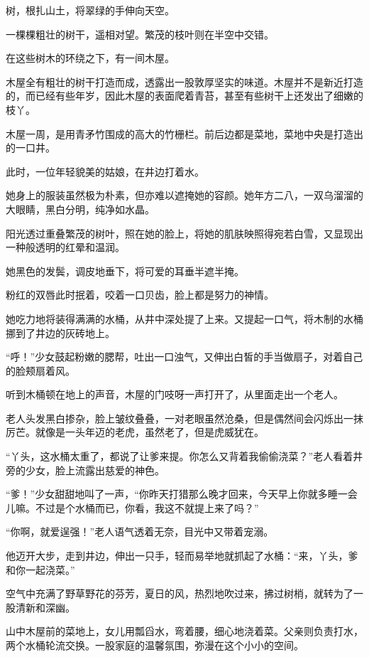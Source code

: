 
\begin{this_body}

树，根扎山土，将翠绿的手伸向天空。

一棵棵粗壮的树干，遥相对望。繁茂的枝叶则在半空中交错。

在这些树木的环绕之下，有一间木屋。

木屋全有粗壮的树干打造而成，透露出一股敦厚坚实的味道。木屋并不是新近打造的，而已经有些年岁，因此木屋的表面爬着青苔，甚至有些树干上还发出了细嫩的枝丫。

木屋一周，是用青矛竹围成的高大的竹栅栏。前后边都是菜地，菜地中央是打造出的一口井。

此时，一位年轻貌美的姑娘，在井边打着水。

她身上的服装虽然极为朴素，但亦难以遮掩她的容颜。她年方二八，一双乌溜溜的大眼睛，黑白分明，纯净如水晶。

阳光透过重叠繁茂的树叶，照在她的脸上，将她的肌肤映照得宛若白雪，又显现出一种般透明的红晕和温润。

她黑色的发鬓，调皮地垂下，将可爱的耳垂半遮半掩。

粉红的双唇此时抿着，咬着一口贝齿，脸上都是努力的神情。

她吃力地将装得满满的水桶，从井中深处提了上来。又提起一口气，将木制的水桶挪到了井边的灰砖地上。

“呼！”少女鼓起粉嫩的腮帮，吐出一口浊气，又伸出白皙的手当做扇子，对着自己的脸颊扇着风。

听到木桶顿在地上的声音，木屋的门吱呀一声打开了，从里面走出一个老人。

老人头发黑白掺杂，脸上皱纹叠叠，一对老眼虽然沧桑，但是偶然间会闪烁出一抹厉芒。就像是一头年迈的老虎，虽然老了，但是虎威犹在。

“丫头，这水桶太重了，都说了让爹来提。你怎么又背着我偷偷浇菜？”老人看着井旁的少女，脸上流露出慈爱的神色。

“爹！”少女甜甜地叫了一声，“你昨天打猎那么晚才回来，今天早上你就多睡一会儿嘛。不过是个水桶而已，你看，我这不就提上来了吗？”

“你啊，就爱逞强！”老人语气透着无奈，目光中又带着宠溺。

他迈开大步，走到井边，伸出一只手，轻而易举地就抓起了水桶：“来，丫头，爹和你一起浇菜。”

空气中充满了野草野花的芬芳，夏日的风，热烈地吹过来，拂过树梢，就转为了一股清新和深幽。

山中木屋前的菜地上，女儿用瓢舀水，弯着腰，细心地浇着菜。父亲则负责打水，两个水桶轮流交换。一股家庭的温馨氛围，弥漫在这个小小的空间。


\end{this_body}
